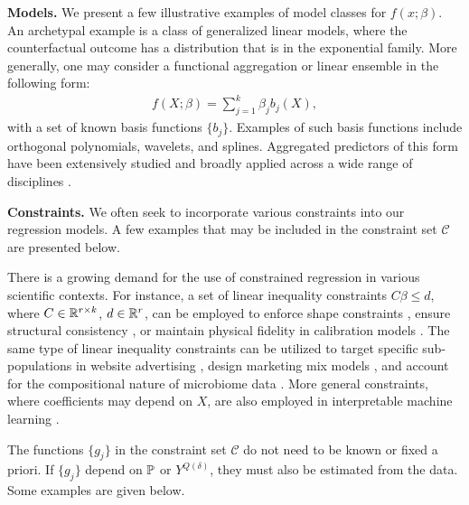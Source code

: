 \textbf{Models.}
We present a few illustrative examples of model classes for $f(x; \beta)$.
An archetypal example is a class of generalized linear models, where the counterfactual outcome has a distribution that is in the exponential family. More generally, one may consider a functional aggregation or linear ensemble in the following form:
\begin{align} \label{eqn:function-aggregation}
    f(X;\beta) = \sum_{j=1}^k \beta_j b_j(X),
\end{align}
with a set of known basis functions $\{b_j\}$. Examples of such basis functions include orthogonal polynomials, wavelets, and splines. Aggregated predictors of this form have been extensively studied and broadly applied across a wide range of disciplines \citep[e.g.,][]{tsybakov2003optimal, nemirovski2009robust, polley2010super}. 

\textbf{Constraints.}
We often seek to incorporate various constraints into our regression models. A few examples that may be included in the constraint set $\mathcal{C}$ are presented below.

\begin{example1} \label{example:constrained-regression}
There is a growing demand for the use of constrained regression in various scientific contexts. For instance, a set of linear inequality constraints $C\beta \leq d$, where $C \in \mathbb{R}^{r\times k}$, $d \in \mathbb{R}^r$, can be employed to enforce shape constraints \citep{james2013penalized, gaines2018algorithms}, ensure structural consistency \citep{liew1976inequality}, or maintain physical fidelity in calibration models \citep{schwendinger2024holistic}. The same type of linear inequality constraints can be utilized to target specific sub-populations in website advertising \citep{james2019penalized}, design marketing mix models \citep{chen2021hierarchical}, and account for the compositional nature of microbiome data \citep{lu2019generalized}. More general constraints, where coefficients may depend on $X$, are also employed in interpretable machine learning \citep[e.g.,][]{zeng2017interpretable}.
\end{example1}

The functions $\{g_j\}$ in the constraint set $\mathcal{C}$ do not need to be known or fixed a priori. If $\{g_j\}$ depend on $\mathbb{P}$ or $Y^{Q(\delta)}$, they must also be estimated from the data. Some examples are given below.

